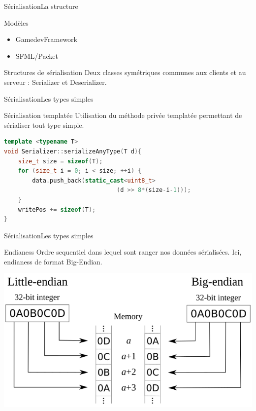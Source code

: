 \documentclass[french]{beamer}
\begin{document}
	    \begin{frame}{Sérialisation}{La structure}
	        \begin{block}{Modèles}
	            \begin{itemize}
	                \item GamedevFramework
	                \item SFML/Packet
	            \end{itemize}
	        \end{block}
	        \begin{block}{Structures de sérialisation}
	            Deux classes symétriques communes aux clients et au serveur : Serializer et Deserializer.
	        \end{block}
	    \end{frame}

		\begin{frame}[fragile]{Sérialisation}{Les types simples}
	        \begin{block}{Sérialisation templatée}
	            Utilisation du méthode privée templatée permettant de sérialiser tout type simple.

	            \begin{lstlisting}[language=C++, caption=Méthode de sérailisation de type simple\, data est notre tableau dynamique\, d la varaible de type T à sérailiser et writePos la position d'écriture du sérialiseur]
template <typename T>
void Serializer::serializeAnyType(T d){
    size_t size = sizeof(T);
    for (size_t i = 0; i < size; ++i) {
	    data.push_back(static_cast<uint8_t>
	    						(d >> 8*(size-i-1))); 
    }
    writePos += sizeof(T);
}\end{lstlisting}

	        \end{block}
	    \end{frame}

	    \begin{frame}[fragile]{Sérialisation}{Les types simples}
	        \begin{block}{Endianess}
	            Ordre sequentiel dans lequel sont ranger nos données sérialisées.
	            Ici, endianess de format Big-Endian.
	        \end{block}

	        \begin{center}
	        	\includegraphics[scale=0.25]{img/endianess.png}
	    	\end{center}
	    \end{frame}
\end{document}
